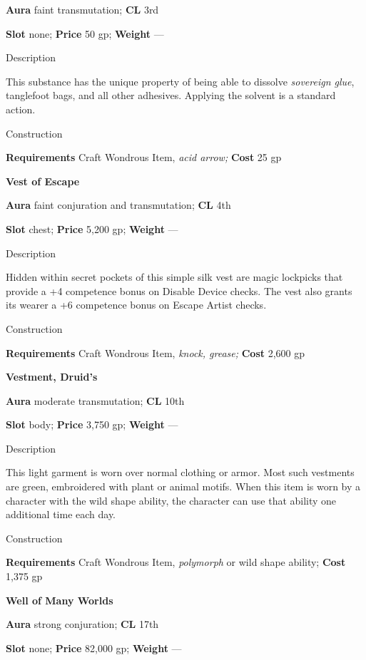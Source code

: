 \textbf{Aura} faint transmutation;\textbf{ CL }3rd
				
\textbf{Slot} none; \textbf{Price} 50 gp; \textbf{Weight }---
				
Description
				
This substance has the unique property of being able to dissolve \textit{sovereign glue}, tanglefoot bags, and all other adhesives. Applying the solvent is a standard action. 
				
Construction
				
\textbf{Requirements} Craft Wondrous Item,\textit{ acid arrow;}\textbf{ Cost }25 gp
				
\textbf{Vest of Escape}
				
\textbf{Aura} faint conjuration and transmutation;\textbf{ CL }4th
				
\textbf{Slot} chest; \textbf{Price} 5,200 gp; \textbf{Weight }---
				
Description
				
Hidden within secret pockets of this simple silk vest are magic lockpicks that provide a +4 competence bonus on Disable Device checks. The vest also grants its wearer a +6 competence bonus on Escape Artist checks. 
				
Construction
				
\textbf{Requirements} Craft Wondrous Item,\textit{ knock, grease;}\textbf{ Cost }2,600 gp
				
\textbf{Vestment, Druid's}
				
\textbf{Aura} moderate transmutation;\textbf{ CL }10th
				
\textbf{Slot} body; \textbf{Price} 3,750 gp; \textbf{Weight }---
				
Description
				
This light garment is worn over normal clothing or armor. Most such vestments are green, embroidered with plant or animal motifs. When this item is worn by a character with the wild shape ability, the character can use that ability one additional time each day. 
				
Construction
				
\textbf{Requirements} Craft Wondrous Item,\textit{ polymorph }or wild shape ability;\textbf{ Cost }1,375 gp
				
\textbf{Well of Many Worlds}
				
\textbf{Aura} strong conjuration;\textbf{ CL }17th
				
\textbf{Slot} none; \textbf{Price} 82,000 gp; \textbf{Weight }---
				
